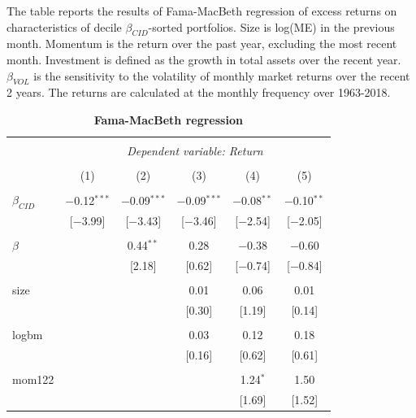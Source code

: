 \documentclass[12pt]{article}
\begin{document}
\begin{table}[!htbp] \centering 
  \caption{\textbf{Fama-MacBeth regression}} 
  \label{} 
  \begin{flushleft}
    {\medskip\small
The table reports the results of Fama-MacBeth regression of excess returns on characteristics of decile $\beta_{CID}$-sorted portfolios. Size is log(ME) in the previous month. Momentum is the return over the past year, excluding the most recent month. Investment is defined as the growth in total assets over the recent year. $\beta_{VOL}$ is the sensitivity to the volatility of monthly market returns over the recent 2 years. The returns are calculated at the monthly frequency over 1963-2018.}
    \medskip
    \end{flushleft}
\begin{tabular}{@{\extracolsep{5pt}}lccccc} 
\\[-1.8ex]\hline 
\hline \\[-1.8ex] 
 & \multicolumn{5}{c}{\textit{Dependent variable: Return}} \\ 
\cline{2-6} 
\\[-1.8ex] & (1) & (2) & (3) & (4) & (5)\\ 
\hline \\[-1.8ex] 
 $\beta_{CID}$ & $-$0.12$^{***}$ & $-$0.09$^{***}$ & $-$0.09$^{***}$ & $-$0.08$^{**}$ & $-$0.10$^{**}$ \\ 
  & [$-$3.99] & [$-$3.43] & [$-$3.46] & [$-$2.54] & [$-$2.05] \\ 
  & & & & & \\ 
 $\beta$ &  & 0.44$^{**}$ & 0.28 & $-$0.38 & $-$0.60 \\ 
  &  & [2.18] & [0.62] & [$-$0.74] & [$-$0.84] \\ 
  & & & & & \\ 
 size &  &  & 0.01 & 0.06 & 0.01 \\ 
  &  &  & [0.30] & [1.19] & [0.14] \\ 
  & & & & & \\ 
 logbm &  &  & 0.03 & 0.12 & 0.18 \\ 
  &  &  & [0.16] & [0.62] & [0.61] \\ 
  & & & & & \\ 
 mom122 &  &  &  & 1.24$^{*}$ & 1.50 \\ 
  &  &  &  & [1.69] & [1.52] \\ 

\end{tabular}
\end{table}
\end{document}
